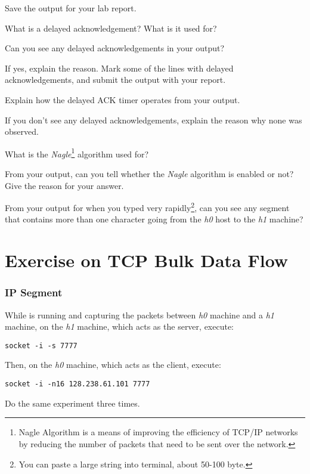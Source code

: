 \documentclass{../UTNetLab}
\begin{document}
{Save} the  output for your lab report.

\begin{report}
    \item What is a delayed acknowledgement?
    What is it used for?

    \item Can you see any delayed acknowledgements in your  output?

    If yes, explain the reason.
    Mark some of the lines with delayed acknowledgements, and submit the  output with your report.

    Explain how the delayed ACK timer operates from your  output.

    If you don’t see any delayed acknowledgements, explain the reason why none was observed.

    \item What is the \textit{Nagle}\footnote{Nagle Algorithm is a means of improving the efficiency of TCP/IP networks by reducing the number of packets that need to be sent over the network.} algorithm used for?

    From your  output, can you tell whether the \textit{Nagle} algorithm is enabled or not? Give the reason for your answer.

    From your  output for when you typed very rapidly\footnote{You can paste a large string into terminal, about 50-100 byte.}, can you see any segment that contains more than one character going from the \textit{h0} host to the \textit{h1} machine?
\end{report}

\part{Exercise on TCP Bulk Data Flow}
\section{IP Segment}
While  is running and capturing the packets between \textit{h0} machine and a \textit{h1} machine, on the \textit{h1} machine, which acts as the server, execute:
\begin{lstlisting}
socket -i -s 7777
    \end{lstlisting}
Then, on the \textit{h0} machine, which acts as the client, execute:
\begin{lstlisting}[emph={h1,netlab}]
socket -i -n16 128.238.61.101 7777
    \end{lstlisting}
Do the same experiment three times.
\end{document}
